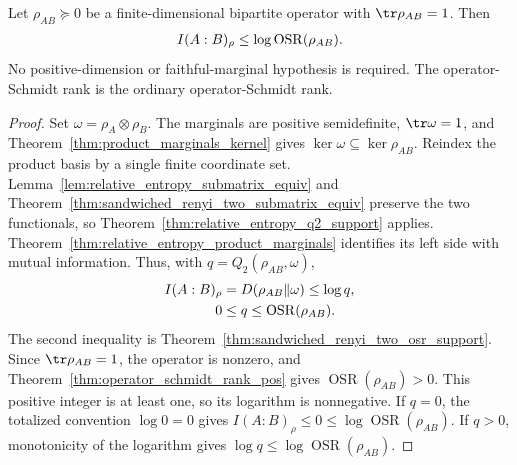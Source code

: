 \begin{theorem}
    \label{thm:mutual_information_le_log_operator_schmidt_rank}
    \leanok

    Let $\rho_{AB}\succeq0$ be a finite-dimensional bipartite operator with
    $\tr\rho_{AB}=1$. Then
    \begin{align}
        I(A:B)_\rho
        \leq \log\operatorname{OSR}(\rho_{AB}).
        \notag
    \end{align}
    No positive-dimension or faithful-marginal hypothesis is required. The
    operator-Schmidt rank is the ordinary operator-Schmidt rank.
\end{theorem}
\begin{proof}\leanok
    Set $\omega=\rho_A\otimes\rho_B$. The marginals are positive semidefinite,
    $\tr\omega=1$, and Theorem~\ref{thm:product_marginals_kernel} gives
    $\ker\omega\subseteq\ker\rho_{AB}$. Reindex the product basis by a single
    finite coordinate set. Lemma~\ref{lem:relative_entropy_submatrix_equiv} and
    Theorem~\ref{thm:sandwiched_renyi_two_submatrix_equiv} preserve the two
    functionals, so Theorem~\ref{thm:relative_entropy_q2_support} applies.
    Theorem~\ref{thm:relative_entropy_product_marginals} identifies its left
    side with mutual information. Thus, with
    $q=Q_2(\rho_{AB},\omega)$,
    \begin{align}
        I(A:B)_\rho
          & =D(\rho_{AB}\Vert\omega)
        \leq\log q,
        \notag                                       \\
        0 & \leq q\leq\operatorname{OSR}(\rho_{AB}).
        \notag
    \end{align}
    The second inequality is
    Theorem~\ref{thm:sandwiched_renyi_two_osr_support}. Since
    $\tr\rho_{AB}=1$, the operator is nonzero, and
    Theorem~\ref{thm:operator_schmidt_rank_pos} gives
    $\operatorname{OSR}(\rho_{AB})>0$. This positive integer is at least one,
    so its logarithm is nonnegative. If $q=0$, the totalized convention
    $\log0=0$ gives $I(A:B)_\rho\leq0\leq\log\operatorname{OSR}(\rho_{AB})$.
    If $q>0$, monotonicity of the logarithm gives
    $\log q\leq\log\operatorname{OSR}(\rho_{AB})$.
\end{proof}

